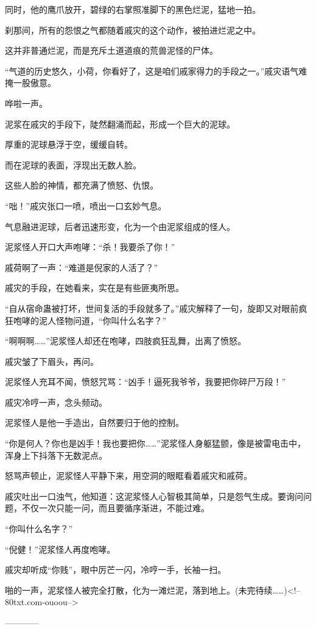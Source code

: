 \begin{this_body}
同时，他的鹰爪放开，碧绿的右掌照准脚下的黑色烂泥，猛地一拍。

刹那间，所有的怨恨之气都随着戚灾的这个动作，被拍进烂泥之中。

这并非普通烂泥，而是充斥土道道痕的荒兽泥怪的尸体。

“气道的历史悠久，小荷，你看好了，这是咱们戚家得力的手段之一。”戚灾语气难掩一股傲意。

哗啦一声。

泥浆在戚灾的手段下，陡然翻涌而起，形成一个巨大的泥球。

厚重的泥球悬浮于空，缓缓自转。

而在泥球的表面，浮现出无数人脸。

这些人脸的神情，都充满了愤怒、仇恨。

“咄！”戚灾张口一喷，喷出一口玄妙气息。

气息融进泥球，后者迅速形变，化为一个由泥浆组成的怪人。

泥浆怪人开口大声咆哮：“杀！我要杀了你！”

戚荷啊了一声：“难道是倪家的人活了？”

戚灾的手段，在她看来，实在是有些匪夷所思。

“自从宿命蛊被打坏，世间复活的手段就多了。”戚灾解释了一句，旋即又对眼前疯狂咆哮的泥人怪物问道，“你叫什么名字？”

“啊啊啊……”泥浆怪人却还在咆哮，四肢疯狂乱舞，出离了愤怒。

戚灾皱了下眉头，再问。

泥浆怪人充耳不闻，愤怒咒骂：“凶手！逼死我爷爷，我要把你碎尸万段！”

戚灾冷哼一声，念头频动。

泥浆怪人是他一手造出，自然要归于他的控制。

“你是何人？你也是凶手！我也要把你……”泥浆怪人身躯猛颤，像是被雷电击中，浑身上下抖落下无数泥点。

怒骂声顿止，泥浆怪人平静下来，用空洞的眼眶看着戚灾和戚荷。

戚灾吐出一口浊气，他知道：这泥浆怪人心智极其简单，只是怨气生成。要询问问题，不仅一次只能一问，而且要循序渐进，不能过难。

“你叫什么名字？”

“倪健！”泥浆怪人再度咆哮。

戚灾却听成“你贱”，眼中厉芒一闪，冷哼一手，长袖一扫。

啪的一声，泥浆怪人被完全打散，化为一滩烂泥，落到地上。(未完待续……)<!--80txt.com-ouoou-->

------------

\end{this_body}

